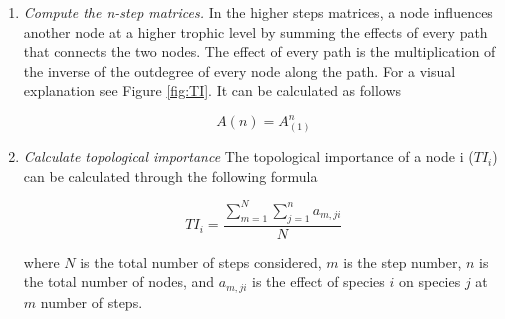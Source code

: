 \documentclass[twocolumn]{article}
\begin{document}
\begin{appendices}
\begin{enumerate}
			\item \emph{Compute the n-step matrices.} \smallskip \newline
			In the higher steps matrices, a node influences another node at a higher trophic level by summing the effects of every path that connects the two nodes. The effect of every path is the multiplication of the inverse of the outdegree of every node along the path. For a visual explanation see Figure \ref{fig:TI}. It can be calculated as follows

								\begin{equation}
									A\left(n\right)=A_{\left(1\right)}^n
								\end{equation}

			\item \emph{Calculate topological importance} \smallskip \newline
			The topological importance of a node i ($TI_i$) can be calculated through the following formula

								\begin{equation}
									TI_i=\frac{\sum\limits^N_{m=1}\sum\limits^n_{j=1}a_{m,ji}}{N}
								\end{equation}

			\noindent where $N$ is the total number of steps considered, $m$ is the step number,  $n$ is the total number of nodes, and $a_{m,ji}$ is the effect of species $i$ on species $j$ at $m$ number of steps.


\end{enumerate}
\end{appendices}
\end{document}
